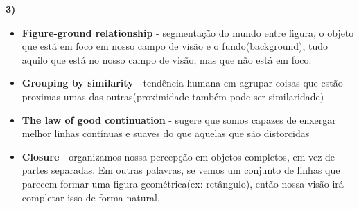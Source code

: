 \textbf{3)} 

\begin{itemize}
	\item \textbf{Figure-ground relationship} - segmentação do mundo entre 
	figura, o objeto que está em foco em nosso campo de visão e o fundo(background),
	tudo aquilo que está no nosso campo de visão, mas que não está em foco.
	\item \textbf{Grouping by similarity} - tendência humana em agrupar coisas que 
	estão proximas umas das outras(proximidade também pode ser similaridade)
	\item \textbf{The law of good continuation} - sugere que somos capazes 
	de enxergar melhor linhas contínuas e suaves do que aquelas que são distorcidas
	\item \textbf{Closure} - organizamos nossa percepção em objetos completos, em 
	vez de partes separadas. Em outras palavras, se vemos um conjunto de linhas 
	que parecem formar uma figura geométrica(ex: retângulo), então nossa visão irá 
	completar isso de forma natural.
\end{itemize}